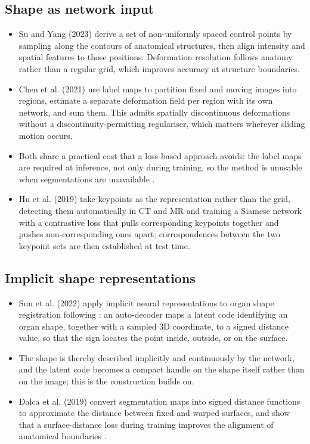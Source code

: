 \subsection{Shape as network input}
\begin{itemize}
\item Su and Yang (2023) derive a set of non-uniformly spaced control points by sampling along the contours of anatomical structures, then align intensity and spatial features to those positions. Deformation resolution follows anatomy rather than a regular grid, which improves accuracy at structure boundaries. %
\item Chen et al. (2021) use label maps to partition fixed and moving images into regions, estimate a separate deformation field per region with its own network, and sum them. This admits spatially discontinuous deformations without a discontinuity-permitting regulariser, which matters wherever sliding motion occurs. %
\item Both share a practical cost that a loss-based approach avoids: the label maps are required at inference, not only during training, so the method is unusable when segmentations are unavailable \citep{chen2025survey}.
\item Hu et al. (2019) take keypoints as the representation rather than the grid, detecting them automatically in CT and MR and training a Siamese network with a contrastive loss that pulls corresponding keypoints together and pushes non-corresponding ones apart; correspondences between the two keypoint sets are then established at test time. %
\end{itemize}

\subsection{Implicit shape representations}
\begin{itemize}
\item Sun et al. (2022) apply implicit neural representations to organ shape registration following \citet{park2019deepsdf}: an auto-decoder maps a latent code identifying an organ shape, together with a sampled 3D coordinate, to a signed distance value, so that the sign locates the point inside, outside, or on the surface. %
\item The shape is thereby described implicitly and continuously by the network, and the latent code becomes a compact handle on the shape itself rather than on the image; this is the construction  builds on.
\item Dalca et al. (2019) convert segmentation maps into signed distance functions to approximate the distance between fixed and warped surfaces, and show that a surface-distance loss during training improves the alignment of anatomical boundaries \citep{chen2025survey}. %
\end{itemize}

